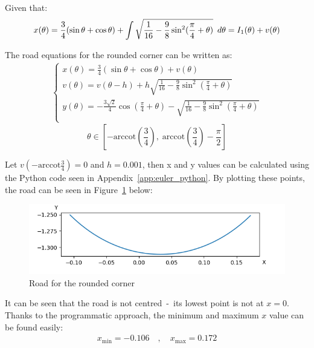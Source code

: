 \documentclass[12pt]{article}
\newcommand{\Hquad}{\hspace{0.5em}}
\begin{document}
        Given that:
        \begin{equation}
            x(\theta) = \frac{3}{4} (\sin\theta + \cos\theta) + \int \sqrt{\frac{1}{16} - \frac{9}{8} \sin^2 (\frac{\pi}{4}+\theta)} \Hquad d\theta = I_1(\theta) + v(\theta)
        \end{equation}

        The road equations for the rounded corner can be written as:
        \begin{align}            
            \begin{cases}
            x(\theta) = \frac{3}{4} (\sin\theta + \cos\theta) + v(\theta) \\ %
            v(\theta) = v(\theta-h) + h \sqrt{\frac{1}{16} - \frac{9}{8} \sin^2 (\frac{\pi}{4}+\theta)} \\
            y(\theta) = - \frac{3\sqrt{2}}{4} \cos (\frac{\pi}{4} + \theta) - \sqrt{\frac{1}{16} - \frac{9}{8} \sin^2 (\frac{\pi}{4}+\theta)} \\
        \end{cases}
        \end{align}
        \[ \theta \in [- \text{arccot}(\frac{3}{4}), \;\text{arccot}(\frac{3}{4}) - \frac{\pi}{2}] \]

        Let $v(-\text{arccot}\frac{3}{4}) = 0$ and $h=0.001$, then x and y values can be calculated using the Python code seen in Appendix~\ref{app:euler_python}. By plotting these points, the road can be seen in Figure~\ref{fig:corner_road} below:
        \begin{figure}[H]
            \includegraphics[width=\linewidth]{images/corner_road.png}
            \caption{Road for the rounded corner}\label{fig:corner_road}
        \end{figure}

        It can be seen that the road is not centred~-~its lowest point is not at $x=0$. Thanks to the programmatic approach, the minimum and maximum $x$ value can be found easily:
        \begin{align*}
            x_{\text{min}} = -0.106 \quad , \quad x_{\text{max}} = 0.172
        \end{align*}
\end{document}
